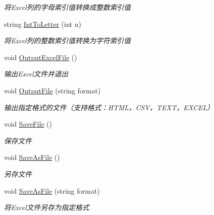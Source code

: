 \begin{DoxyCompactItemize}
\begin{DoxyCompactList}\small\item\em 将\-Excel列的字母索引值转换成整数索引值 \end{DoxyCompactList}\item 
string \hyperlink{class_x_c_l_net_tools_1_1_office_1_1_excel_handler_1_1_excel_helper_a836d286d62fb23c00f87b81fd197e006}{Int\-To\-Letter} (int n)
\begin{DoxyCompactList}\small\item\em 将\-Excel列的整数索引值转换为字符索引值 \end{DoxyCompactList}\item 
void \hyperlink{class_x_c_l_net_tools_1_1_office_1_1_excel_handler_1_1_excel_helper_a4eefc84b1fe60281333eb6e1a3e9c4eb}{Output\-Excel\-File} ()
\begin{DoxyCompactList}\small\item\em 输出\-Excel文件并退出 \end{DoxyCompactList}\item 
void \hyperlink{class_x_c_l_net_tools_1_1_office_1_1_excel_handler_1_1_excel_helper_ad562788e030ea85104763082c228fa23}{Output\-File} (string format)
\begin{DoxyCompactList}\small\item\em 输出指定格式的文件（支持格式：\-H\-T\-M\-L，\-C\-S\-V，\-T\-E\-X\-T，\-E\-X\-C\-E\-L） \end{DoxyCompactList}\item 
void \hyperlink{class_x_c_l_net_tools_1_1_office_1_1_excel_handler_1_1_excel_helper_a85e4eb3e29066ce7d82fab75fcb713ab}{Save\-File} ()
\begin{DoxyCompactList}\small\item\em 保存文件 \end{DoxyCompactList}\item 
void \hyperlink{class_x_c_l_net_tools_1_1_office_1_1_excel_handler_1_1_excel_helper_ae17970792f4828d10ae35f6f0deefcba}{Save\-As\-File} ()
\begin{DoxyCompactList}\small\item\em 另存文件 \end{DoxyCompactList}\item 
void \hyperlink{class_x_c_l_net_tools_1_1_office_1_1_excel_handler_1_1_excel_helper_a26e058e269d771b774e4419ea5df46b6}{Save\-As\-File} (string format)
\begin{DoxyCompactList}\small\item\em 将\-Excel文件另存为指定格式 \end{DoxyCompactList}\item 

\end{DoxyCompactItemize}
